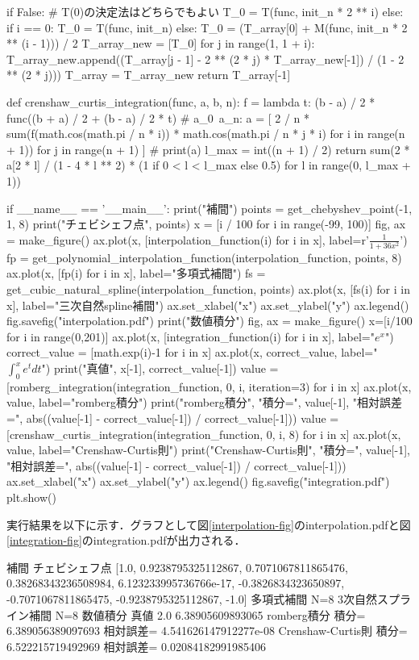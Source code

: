 \documentclass{jsarticle}
\begin{document}
\begin{spverbatim}
        if False:  # T(0)の決定法はどちらでもよい
            T_0 = T(func, init_n * 2 ** i)
        else:
            if i == 0:
                T_0 = T(func, init_n)
            else:
                T_0 = (T_array[0] + M(func, init_n * 2 ** (i - 1))) / 2
        T_array_new = [T_0]
        for j in range(1, 1 + i):
            T_array_new.append((T_array[j - 1] - 2 ** (2 * j) * T_array_new[-1]) / (1 - 2 ** (2 * j)))
        T_array = T_array_new
    return T_array[-1]


def crenshaw_curtis_integration(func, a, b, n):
    f = lambda t: (b - a) / 2 * func((b + a) / 2 + (b - a) / 2 * t)
    # a_0~a_n:
    a = [
        2 / n * sum(f(math.cos(math.pi / n * i)) * math.cos(math.pi / n * j * i) for i in range(n + 1))
        for j in range(n + 1)
    ]
    # print(a)
    l_max = int((n + 1) / 2)
    return sum(2 * a[2 * l] / (1 - 4 * l ** 2) * (1 if 0 < l < l_max else 0.5) for l in range(0, l_max + 1))


if __name__ == '__main__':
    print("補間")
    points = get_chebyshev_point(-1, 1, 8)
    print("チェビシェフ点", points)
    x = [i / 100 for i in range(-99, 100)]
    fig, ax = make_figure()
    ax.plot(x, [interpolation_function(i) for i in x], label=r'$\frac{1}{1+36x^2}$')
    fp = get_polynomial_interpolation_function(interpolation_function, points, 8)
    ax.plot(x, [fp(i) for i in x], label="多項式補間")
    fs = get_cubic_natural_spline(interpolation_function, points)
    ax.plot(x, [fs(i) for i in x], label="三次自然spline補間")
    ax.set_xlabel("x")
    ax.set_ylabel("y")
    ax.legend()
    fig.savefig("interpolation.pdf")
    print("数値積分")
    fig, ax = make_figure()
    x=[i/100 for i in range(0,201)]
    ax.plot(x, [integration_function(i) for i in x], label="$e^x$")
    correct_value = [math.exp(i)-1 for i in x]
    ax.plot(x, correct_value, label="$\int_0^x e^t dt$")
    print("真値", x[-1], correct_value[-1])
    value = [romberg_integration(integration_function, 0, i, iteration=3) for i in x]
    ax.plot(x, value, label="romberg積分")
    print("romberg積分", "積分=", value[-1], "相対誤差=", abs((value[-1] - correct_value[-1]) / correct_value[-1]))
    value = [crenshaw_curtis_integration(integration_function, 0, i, 8) for i in x]
    ax.plot(x, value, label="Crenshaw-Curtis則")
    print("Crenshaw-Curtis則", "積分=", value[-1], "相対誤差=", abs((value[-1] - correct_value[-1]) / correct_value[-1]))
    ax.set_xlabel("x")
    ax.set_ylabel("y")
    ax.legend()
    fig.savefig("integration.pdf")
    plt.show()

\end{spverbatim}

実行結果を以下に示す．グラフとして図\ref{interpolation-fig}のinterpolation.pdfと図\ref{integration-fig}のintegration.pdfが出力される．

\begin{spverbatim}
補間
チェビシェフ点 [1.0, 0.9238795325112867, 0.7071067811865476, 0.38268343236508984, 6.123233995736766e-17, -0.3826834323650897, -0.7071067811865475, -0.9238795325112867, -1.0]
多項式補間 N=8
3次自然スプライン補間 N=8
数値積分
真値 2.0 6.38905609893065
romberg積分 積分= 6.389056389097693 相対誤差= 4.541626147912277e-08
Crenshaw-Curtis則 積分= 6.522215719492969 相対誤差= 0.02084182991985406
\end{spverbatim}
\end{document}
